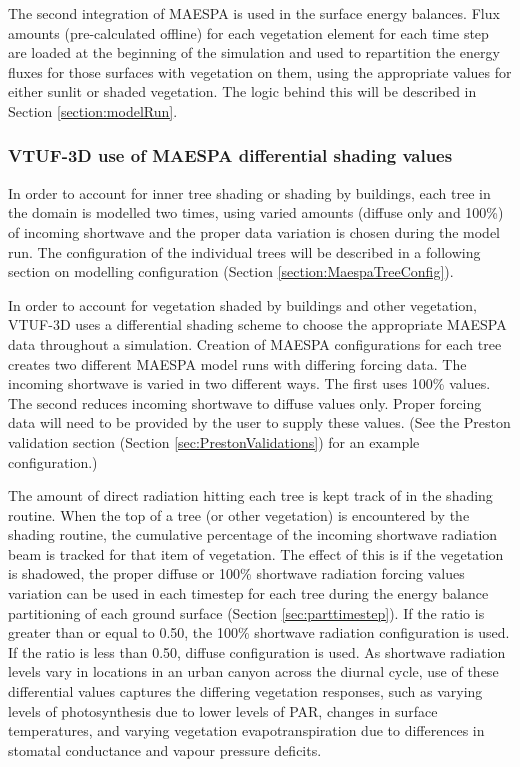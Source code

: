 \documentclass[preprint,12pt,authoryear]{elsarticle}
\begin{document}
The second integration of MAESPA is used in the surface energy balances. Flux amounts (pre-calculated offline) for each vegetation element for each time step are loaded at the beginning of the simulation and used to repartition the energy fluxes for those surfaces with vegetation on them, using the appropriate values for either sunlit or shaded vegetation. The logic behind this will be described in Section \ref{section:modelRun}.


\subsubsection{VTUF-3D use of MAESPA differential shading values}\label{sec:4diffshading}

In order to account for inner tree shading or shading by buildings, each tree in the domain is modelled two times, using varied amounts (diffuse only and 100\%) of incoming shortwave and the proper data variation is chosen during the model run. The configuration of the individual trees will be described in a following section on modelling configuration (Section \ref{section:MaespaTreeConfig}). 

In order to account for vegetation shaded by buildings and other vegetation, VTUF-3D uses a differential shading scheme to choose the appropriate MAESPA data throughout a simulation. Creation of MAESPA configurations for each tree creates two different MAESPA model runs with differing forcing data. The incoming shortwave is varied in two different ways. The first uses 100\% values. The second reduces incoming shortwave to diffuse values only. Proper forcing data will need to be provided by the user to supply these values. (See the Preston validation section (Section \ref{sec:PrestonValidations}) for an example configuration.)


The amount of direct radiation hitting each tree is kept track of in the shading routine. When the top of a tree (or other vegetation) is encountered by the shading routine, the cumulative percentage of the incoming shortwave radiation beam is tracked for that item of vegetation. The effect of this is if the vegetation is shadowed, the proper diffuse or 100\% shortwave radiation forcing values variation can be used in each timestep for each tree during the energy balance partitioning of each ground surface (Section \ref{sec:parttimestep}). If the ratio is greater than or equal to 0.50, the 100\% shortwave radiation configuration is used. If the ratio is less than 0.50, diffuse configuration is used. As shortwave radiation levels vary in locations in an urban canyon across the diurnal cycle, use of these differential values captures the differing vegetation responses, such as varying levels of photosynthesis due to lower levels of PAR, changes in surface temperatures, and varying vegetation evapotranspiration due to differences in stomatal conductance and vapour pressure deficits.
\end{document}
